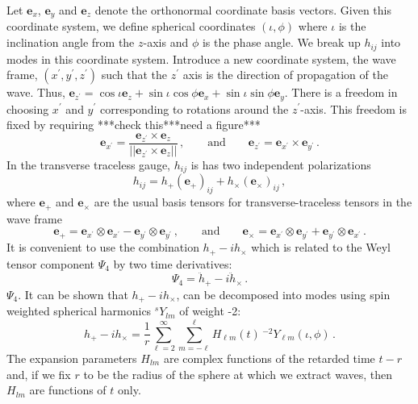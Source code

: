 \documentclass{article}
\numberwithin{equation}{section}
\newcommand{\Ys}{{{}^sY}}
\newcommand{\Ytwo}{{{}^{-2}Y}}
\newcommand{\xhat}{\mathbf{e}_x}
\newcommand{\yhat}{\mathbf{e}_y}
\newcommand{\zhat}{\mathbf{e}_z}
\newcommand{\eplus}{\mathbf{e}_+}
\newcommand{\ecross}{\mathbf{e}_\times}
\newcommand{\rhat}{\mathbf{e}_{z^\prime}}
\newcommand{\iotahat}{\mathbf{e}_{x^\prime}}
\newcommand{\phihat}{\mathbf{e}_{y^\prime}}
\begin{document}
Let $\xhat$, $\yhat$ and $\zhat$ denote the
orthonormal coordinate basis vectors. Given this coordinate system, we
define spherical coordinates $(\iota,\phi)$ where $\iota$ is the
inclination angle from the $z$-axis and $\phi$ is the phase angle.  We
break up $h_{ij}$ into modes in this coordinate system.  Introduce a
new coordinate system, the wave frame, $(x^\prime, y^\prime,
z^\prime)$ such that the $z^\prime$ axis is the direction of
propagation of the wave.  Thus, $\rhat = \cos\iota
 \zhat + \sin\iota\cos\phi \xhat +
\sin\iota\sin\phi \yhat$. There is a freedom in choosing
$x^\prime$ and $y^\prime$ corresponding to rotations around the
$z^\prime$-axis.  This freedom is fixed by requiring ***check this***need a figure***
\begin{equation}
  \label{eq:8}
  \iotahat =
  \frac{\rhat\times\zhat}{||\rhat\times\zhat||} \,, 
  \qquad \textrm{and} \qquad 
  \rhat = \iotahat \times \phihat \,.
\end{equation}
In the transverse traceless gauge, $h_{ij}$ is has two independent
polarizations 
\begin{equation}
  \label{eq:2}
  h_{ij} = h_+ (\eplus)_{ij} + h_\times (\ecross)_{ij}\,,
\end{equation}
where $\eplus$ and $\ecross$ are the usual basis tensors for
transverse-traceless tensors in the wave frame
\begin{equation}
  \label{eq:9}
  \eplus = \iotahat\otimes\iotahat -
  \phihat\otimes\phihat\,, \qquad \textrm{and} \qquad 
  \ecross = \iotahat\otimes\phihat +
  \phihat\otimes\iotahat\,. 
\end{equation}
It is convenient to use the combination $h_+ - ih_\times$ which is
related to the Weyl tensor component $\Psi_4$ by two time derivatives:
\begin{equation}
  \label{eq:3}
  \Psi_4 = \ddot{h}_+ -i\ddot{h}_\times\,.
\end{equation}
$\Psi_4$. It can be shown that $h_+-ih_\times$, can be decomposed into
modes using spin weighted spherical harmonics $\Ys_{lm}$ of weight
-2:
\begin{equation}
  \label{eq:4}
  h_+ - ih_\times = \frac{1}{r}\sum_{\ell=2}^{\infty}\sum_{m=-\ell}^\ell H_{\ell m}(t)\,
  \Ytwo_{\ell m}(\iota,\phi)\,.
\end{equation}
The expansion parameters $H_{lm}$ are complex functions of the retarded time
$t-r$ and, if we fix $r$ to be the radius of the sphere at which we
extract waves, then $H_{lm}$ are functions of $t$ only.  
\end{document}
